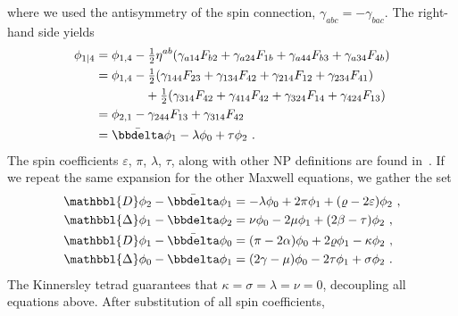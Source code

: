 where we used the antisymmetry of the spin connection, $\gamma_{abc}=-\gamma_{bac}$. The right-hand side yields
\begin{align}
    \label{eq3:phi21SpinCoef}
    \begin{split}
        \phi_{1\rvert 4} &= \phi_{1, 4} - \tfrac{1}{2} \eta^{ab}( \gamma_{a14} F_{b2} + \gamma_{a24} F_{1b} + \gamma_{a44} F_{b3} + \gamma_{a34} F_{4b} ) \\
        &= \phi_{1, 4} - \tfrac{1}{2} ( \gamma_{144} F_{23} + \gamma_{134} F_{42} + \gamma_{214} F_{12} + \gamma_{234} F_{41} ) \\ 
        &\qquad\qquad + \tfrac{1}{2} ( \gamma_{314} F_{42} + \gamma_{414} F_{42} + \gamma_{324} F_{14} + \gamma_{424} F_{13} ) \\
        &= \phi_{2, 1} - \gamma_{244} F_{13} + \gamma_{314} F_{42} \\
        &= \bar{\bbdelta} \phi_1 - \lambda \phi_0 + \tau \phi_2  ~.
    \end{split}
\end{align}
The spin coefficients $\varepsilon$, $\pi$, $\lambda$, $\tau$, along with other NP definitions are found in~. If we repeat the same expansion for the other Maxwell equations, we gather the set
\begin{subequations}
    \begin{align}
        \label{eq3:phi21phi14SpinCoef}
        \mathbbl{D} \phi_2 - \bar{\bbdelta} \phi_1 &= -\lambda \phi_0 + 2 \pi \phi_1 + (\varrho - 2 \varepsilon) \phi_2 ~,\\
        \label{eq3:phi12phi23SpinCoef}
        \mathbbl{\Delta} \phi_1 - \bbdelta \phi_2 &= \nu \phi_0 - 2 \mu \phi_1 + (2\beta-\tau) \phi_2 ~,\\
        \label{eq3:phi11phi04SpinCoef}
        \mathbbl{D} \phi_1 - \bar{\bbdelta} \phi_0 &= (\pi - 2 \alpha) \phi_0 + 2 \varrho \phi_1 - \kappa \phi_2 ~,\\
        \label{eq3:phi02phi13SpinCoef}
        \mathbbl{\Delta} \phi_0 - \bbdelta \phi_1 &= (2 \gamma - \mu) \phi_0 - 2 \tau \phi_1 + \sigma \phi_2 ~.
    \end{align}
\end{subequations}
The Kinnersley tetrad guarantees that $\kappa = \sigma = \lambda = \nu = 0$, decoupling all equations above. After substitution of all spin coefficients,
